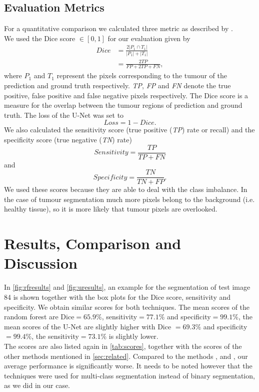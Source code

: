 \documentclass[final]{article}
\begin{document}
\subsection{Evaluation Metrics} \label{sec:metrics}
For a quantitative comparison we calculated three metric as described by \cite{BRATS}. \\
We used the Dice score $\in [0,1]$ for our evaluation given by
\begin{align}
\mathit{Dice} &= \frac{2|P_1 \cap T_1|}{|P_1|+|T_1|} \\
& = 	\frac{2 \mathit{TP}}{\mathit{FP} + 2 \mathit{TP} + \mathit{FN}},
\end{align}
where $P_1$ and $T_1$ represent the pixels corresponding to the tumour of the prediction and ground truth respectively. \textit{TP}, \textit{FP} and \textit{FN} denote the true positive, false positive and false negative pixels respectively. The Dice score is a measure for the overlap between the tumour regions of prediction and ground truth.
The loss of the U-Net was set to
\begin{equation}
\mathit{Loss} = 1 - \mathit{Dice}.
\end{equation}
We also calculated the sensitivity score (true positive (\textit{TP}) rate or recall) and the specificity score (true negative (\textit{TN}) rate)
\begin{equation}
\mathit{Sensitivity} = 	\frac{\mathit{TP}}{\mathit{TP} + \mathit{FN}}
\end{equation}
and
\begin{equation}
\mathit{Specificity} = 	\frac{\mathit{TN}}{\mathit{TN} + \mathit{FP}}.
\end{equation}
We used these scores because they are able to deal with the class imbalance. In the case of tumour segmentation much more pixels belong to the background (i.e. healthy tissue), so it is more likely that tumour pixels are overlooked.

\section{Results, Comparison and Discussion} \label{sec:results}

In
\cref{fig:rfresults} and \ref{fig:uresults}, an example for the segmentation of test image 84 is shown
together with the box plots for the Dice score, sensitivity and specificity. We obtain similar scores for both techniques.
The mean scores of the random forest are Dice$=65.9 \% $, sensitivity$=77.1 \%$ and
specificity$=99.1 \%$, the mean scores of the U-Net are slightly higher with Dice $=69.3 \% $ and
specificity $=99.4 \%$, the sensitivity$=73.1 \%$ is slightly lower.\\
The scores are also listed again in \cref{tab:scores}, together with the scores of the other methods mentioned in \cref{sec:related}. Compared to the methods \cite{maier2015}, \cite{dong2017} and \cite{brats2017short}, our average performance is significantly worse. It needs to be noted however that the techniques were used for  multi-class segmentation instead of binary segmentation, as we did in our case.
\end{document}

